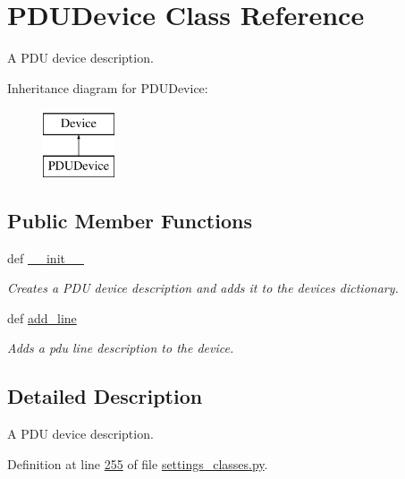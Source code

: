 \hypertarget{classsettings__classes_1_1_p_d_u_device}{\section{\-P\-D\-U\-Device \-Class \-Reference}
\label{classsettings__classes_1_1_p_d_u_device}
}


\-A \-P\-D\-U device description.  


\-Inheritance diagram for \-P\-D\-U\-Device\-:\begin{figure}[H]
\begin{center}
\leavevmode
\includegraphics[height=2.000000cm]{classsettings__classes_1_1_p_d_u_device}
\end{center}
\end{figure}
\subsection*{\-Public \-Member \-Functions}
\begin{DoxyCompactItemize}
\item 
def \hyperlink{classsettings__classes_1_1_p_d_u_device_ac775ee34451fdfa742b318538164070e}{\-\_\-\-\_\-init\-\_\-\-\_\-}
\begin{DoxyCompactList}\small\item\em \-Creates a \-P\-D\-U device description and adds it to the devices dictionary. \end{DoxyCompactList}\item 
def \hyperlink{classsettings__classes_1_1_p_d_u_device_a9b24e7f6a176430603b1aec4ead55473}{add\-\_\-line}
\begin{DoxyCompactList}\small\item\em \-Adds a pdu line description to the device. \end{DoxyCompactList}\end{DoxyCompactItemize}


\subsection{\-Detailed \-Description}
\-A \-P\-D\-U device description. 

\-Definition at line \hyperlink{settings__classes_8py_source_l00255}{255} of file \hyperlink{settings__classes_8py_source}{settings\-\_\-classes.\-py}.



